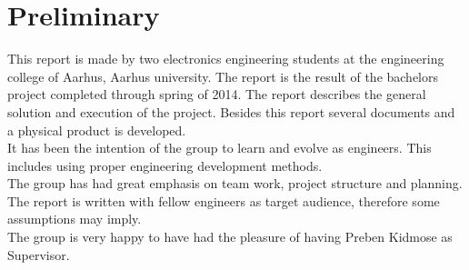 \chapter{Preliminary}

This report is made by two electronics engineering students at the engineering college of Aarhus, Aarhus university. The report is the result of the bachelors project completed through spring of 2014. The report describes the general solution and execution of the project. Besides this report several documents and a physical product is developed.\\
It has been the intention of the group to learn and evolve as engineers. This includes using proper engineering development methods.\\
The group has had great emphasis on team work, project structure and planning.\\
The report is written with fellow engineers as target audience, therefore some assumptions may imply.\\
The group is very happy to have had the pleasure of having Preben Kidmose as Supervisor.\\

